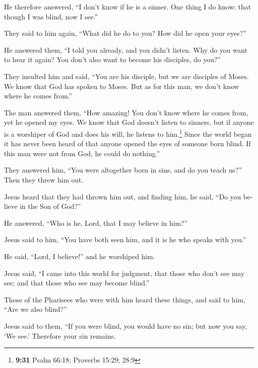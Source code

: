 \begin{paracol}{2}
\begin{otherlanguage}{english}
 He therefore answered, ``I don't know if he is a sinner.
One thing I do know: that though I was blind, now I see.''

 They said to him again, ``What did he do to you? How did
he open your eyes?''

 He answered them, ``I told you already, and you didn't
listen. Why do you want to hear it again? You don't also want to become
his disciples, do you?''

 They insulted him and said, ``You are his disciple, but
we are disciples of Moses.  We know that God has spoken
to Moses. But as for this man, we don't know where he comes from.''

 The man answered them, ``How amazing! You don't know
where he comes from, yet he opened my eyes.  We know that
God doesn't listen to sinners, but if anyone is a worshiper of God and
does his will, he listens to him.\footnote{\textbf{9:31} Psalm 66:18;
  Proverbs 15:29; 28:9}  Since the world began it has
never been heard of that anyone opened the eyes of someone born blind.
 If this man were not from God, he could do nothing.''

 They answered him, ``You were altogether born in sins,
and do you teach us?'' Then they threw him out.

 Jesus heard that they had thrown him out, and finding
him, he said, ``Do you believe in the Son of God?''

 He answered, ``Who is he, Lord, that I may believe in
him?''

 Jesus said to him, ``You have both seen him, and it is
he who speaks with you.''

 He said, ``Lord, I believe!'' and he worshiped him.

 Jesus said, ``I came into this world for judgment, that
those who don't see may see; and that those who see may become blind.''

 Those of the Pharisees who were with him heard these
things, and said to him, ``Are we also blind?''

 Jesus said to them, ``If you were blind, you would have
no sin; but now you say, `We see.' Therefore your sin remains.

\end{otherlanguage}


\end{paracol}
